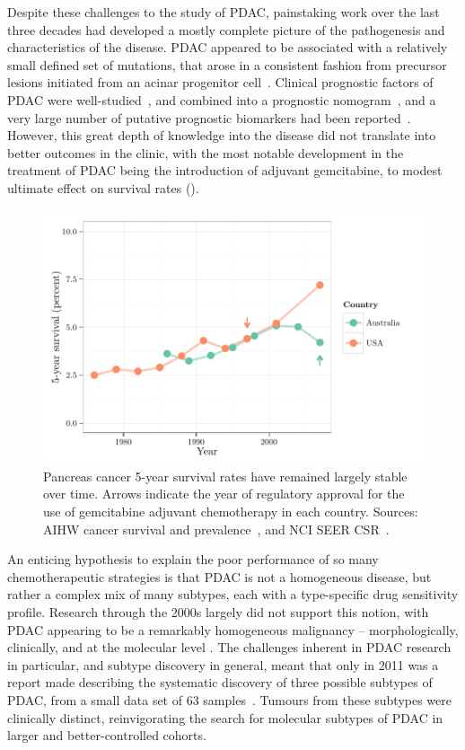 \documentclass[thesis.tex]{subfiles}
\begin{document}
Despite these challenges to the study of \gls{PDAC}, painstaking work over the last three decades had developed a mostly complete picture of the pathogenesis and characteristics of the disease.  \gls{PDAC} appeared to be associated with a relatively small defined set of mutations, that arose in a consistent fashion from precursor lesions initiated from an acinar progenitor cell~\cite{Hilgers1999, Maitra2008, Kopp2012}.  Clinical prognostic factors of \gls{PDAC} were well-studied~\cite{Garcea2008, Riediger2009}, and combined into a prognostic nomogram~\cite{Brennan2004}, and a very large number of putative prognostic biomarkers had been reported~\cite{Harsha2009}.  However, this great depth of knowledge into the disease did not translate into better outcomes in the clinic, with the most notable development in the treatment of \gls{PDAC} being the introduction of adjuvant gemcitabine, to modest ultimate effect on survival rates ().

\begin{figure}[!htbp]
\centering
\includegraphics[width=.9\linewidth]{analysis/intro/figure/historical-survival-pdac-2}
\caption[Historical survival rates of pancreas cancer]{Pancreas cancer 5-year survival rates have remained largely stable over time.  Arrows indicate the year of regulatory approval for the use of gemcitabine adjuvant chemotherapy in each country.  Sources: AIHW cancer survival and prevalence~\cite{CAN65}, and NCI SEER CSR~\cite{SEER2014}.}\label{fig:intro-historical-panc-surv}
\end{figure}

An enticing hypothesis to explain the poor performance of so many chemotherapeutic strategies is that \gls{PDAC} is not a homogeneous disease, but rather a complex mix of many subtypes, each with a type-specific drug sensitivity profile.   Research through the 2000s largely did not support this notion, with \gls{PDAC} appearing to be a remarkably homogeneous malignancy -- morphologically, clinically, and at the molecular level \cite{TODO}.  The challenges inherent in \gls{PDAC} research in particular, and subtype discovery in general, meant that only in 2011 was a report made describing the systematic discovery of three possible subtypes of \gls{PDAC}, from a small data set of 63 samples~\cite{Collisson2011}.  Tumours from these subtypes were clinically distinct, reinvigorating the search for molecular subtypes of \gls{PDAC} in larger and better-controlled cohorts.
\end{document}
